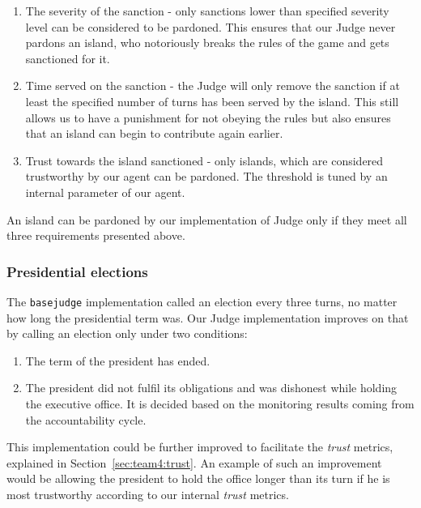 \begin{enumerate}
    \item The severity of the sanction - only sanctions lower than specified severity level can be considered to be pardoned. This ensures that our Judge never pardons an island, who notoriously breaks the rules of the game and gets sanctioned for it.
    \item Time served on the sanction - the Judge will only remove the sanction if at least the specified number of turns has been served by the island. This still allows us to have a punishment for not obeying the rules but also ensures that an island can begin to contribute again earlier.
    \item Trust towards the island sanctioned - only islands, which are considered trustworthy by our agent can be pardoned. The threshold is tuned by an internal parameter of our agent.
\end{enumerate}

An island can be pardoned by our implementation of Judge only if they meet all three requirements presented above. 


\subsubsection{Presidential elections}
The \texttt{basejudge} implementation called an election every three turns, no matter how long the presidential term was. Our Judge implementation improves on that by calling an election only under two conditions:
\begin{enumerate}
    \item The term of the president has ended.
    \item The president did not fulfil its obligations and was dishonest while holding the executive office. It is decided based on the monitoring results coming from the accountability cycle.
\end{enumerate}

This implementation could be further improved to facilitate the \emph{trust} metrics, explained in Section~\ref{sec:team4:trust}. An example of such an improvement would be allowing the president to hold the office longer than its turn if he is most trustworthy according to our internal \emph{trust} metrics.

